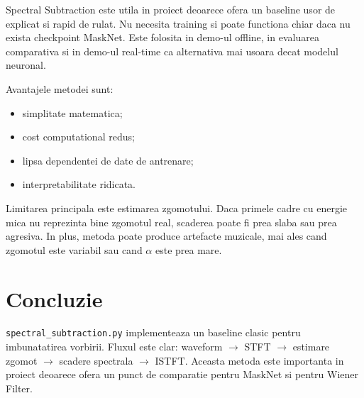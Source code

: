 \documentclass[12pt,a4paper]{report}
\begin{document}
Spectral Subtraction este utila in proiect deoarece ofera un baseline usor de
explicat si rapid de rulat. Nu necesita training si poate functiona chiar daca
nu exista checkpoint MaskNet. Este folosita in demo-ul offline, in evaluarea
comparativa si in demo-ul real-time ca alternativa mai usoara decat modelul
neuronal.

Avantajele metodei sunt:

\begin{itemize}
    \item simplitate matematica;
    \item cost computational redus;
    \item lipsa dependentei de date de antrenare;
    \item interpretabilitate ridicata.
\end{itemize}

Limitarea principala este estimarea zgomotului. Daca primele cadre cu energie
mica nu reprezinta bine zgomotul real, scaderea poate fi prea slaba sau prea
agresiva. In plus, metoda poate produce artefacte muzicale, mai ales cand zgomotul
este variabil sau cand \(\alpha\) este prea mare.

\chapter{Concluzie}

\texttt{spectral\_subtraction.py} implementeaza un baseline clasic pentru
imbunatatirea vorbirii. Fluxul este clar: waveform \(\rightarrow\) STFT
\(\rightarrow\) estimare zgomot \(\rightarrow\) scadere spectrala \(\rightarrow\)
ISTFT. Aceasta metoda este importanta in proiect deoarece ofera un punct de
comparatie pentru MaskNet si pentru Wiener Filter.
\end{document}
